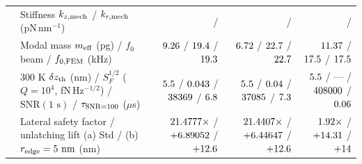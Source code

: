 \begin{table}[!htbp]
{\begin{tabular}{llrrr}
 & Stiffness $k_{z,\rm mech}$ / $k_{r,\rm mech}$ (pN\,nm$^{-1}$) & \NatureRotCeightCompactNtwoLateralStabilityCompactClutchKZMechPnPerNm{} / \NatureRotCeightCompactNtwoLateralStabilityCompactClutchKRMechPnPerNm{} & \NatureRotCeightCompactNtwoLateralStabilityCompactClutchKZMechPnPerNm{} / \NatureRotCeightCompactNtwoLateralStabilityCompactClutchKRMechPnPerNm{} & \NatureRotCeightCompactNtwoLateralStabilityCompactClutchKZMechPnPerNm{} / \NatureRotCeightCompactNtwoLateralStabilityCompactClutchKRMechPnPerNm{} \\
 & Modal mass $m_{\rm eff}$ (pg) / $f_0$ beam / $f_{0,\rm FEM}$ (kHz) & $\roundtwo{\NatureCantorNtwoHybridrzMEffRegthreePg}$ / $\roundone{\NatureCantorNtwoHybridrzResFreqRegimeThreeKhz}$ / $\roundone{\NatureCantorNtwoHybridrzFemFreqRegthreeKhz}$ & $\roundtwo{\NatureRotCeightCompactNtwoMEffRegthreePg}$ / $\roundone{\NatureRotCeightCompactNtwoResFreqRegimeThreeKhz}$ / $\roundone{\NatureRotCeightCompactNtwoFemFreqRegthreeKhz}$ & $\roundtwo{\NatureFthreeOneoneoneMEffRegthreePg}$ / $\roundone{\NatureFthreeOneoneoneFZeroRegthreeKhz}$ / $\roundone{\NatureFthreeOneoneoneFemFreqRegthreeKhz}$ \\
 & 300 K $\delta z_{\rm th}$ (nm) / $S_F^{1/2}$ ($Q=10^4$, fN\,Hz$^{-1/2}$) / $\mathrm{SNR}(1\text{ s})$ / $\tau_{\rm SNR=100}$ ($\mu$s) & $\roundtwo{\NatureCantorNtwoHybridrzThermalDzRegimeThreeNm}$ / $\roundthree{\NatureCantorNtwoHybridrzSfSqrtRegthreeQoneefourFn}$ / $\roundzero{\NatureCantorNtwoHybridrzSnrOneSecRegthree}$ / $\roundone{\NatureCantorNtwoHybridrzTauSnronezerozeroRegthreeQoneefourUs}$ & $\roundtwo{\NatureRotCeightCompactNtwoThermalDzRegimeThreeNm}$ / $\roundthree{\NatureRotCeightCompactNtwoSfSqrtRegthreeQoneefourFn}$ / $\roundzero{\NatureRotCeightCompactNtwoSnrOneSecRegthree}$ / $\roundone{\NatureRotCeightCompactNtwoTauSnronezerozeroRegthreeQoneefourUs}$ & $\roundtwo{\NatureCantorNtwoHybridrzThermalDzRegimeThreeNm}$ / --- / $\roundzero{\NatureFthreeOneoneoneSnrOneSecRegthreeQoneefour}$ / $\roundtwo{\NatureFthreeOneoneoneTauSnronezerozeroRegthreeQoneefourUs}$ \\
 & Lateral safety factor / unlatching lift (a) Std / (b) $r_{\rm edge}=5\text{ nm}$ (nm) & $21.4777{}\times$ / $+6.89052{}$ / $+12.6{}$ & $21.4407{}\times$ / $+6.44647{}$ / $+12.6{}$ & $\roundtwo{\NatureFthreeOneoneoneRegthreeLateralStabilitySafetyFactor}\times$ / $+\roundtwo{\NatureFthreeOneoneoneRegthreeSelfConsistentBasinRepulsiveLiftNm}$ / $+\roundtwo{\NatureFthreeOneoneoneRegthreeRfivenmBasinLiftNm}$ \\

\end{tabular}}
\end{table}
